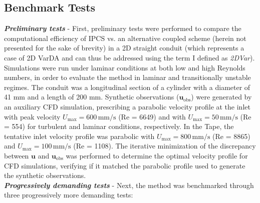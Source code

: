 \subsection*{Benchmark Tests}
\label{sec:bench}
\textbf{\textit{Preliminary tests}} - 
First, preliminary tests were performed to compare the computational efficiency of IPCS vs. an alternative coupled scheme (herein not presented for the sake of brevity) in a 2D straight conduit (which represents a case of 2D VarDA and can thus be addressed using the term I defined as \emph{2DVar}). Simulations were run under laminar conditions at both low and high Reynolds numbers, in order to evaluate the method in laminar and transitionally unstable regimes. 
The conduit was a longitudinal section of a cylinder with a diameter of 41 mm and a length of 200 mm. Synthetic observations (\( \mathbf{u}_{\text{obs}} \)) were generated by an auxiliary CFD simulation, prescribing a parabolic velocity profile at the inlet with peak velocity \( U_{\text{max}} = 600 \, \text{mm/s} \) (Re = 6649) and with \( U_{\text{max}} = 50 \, \text{mm/s} \) (Re = 554) for turbulent and laminar conditions, respectively.
In the Tape, the tentative inlet velocity profile was parabolic with \( U_{\text{max}} = 800 \, \text{mm/s} \) (Re = 8865) and \( U_{\text{max}} = 100 \, \text{mm/s} \) (Re = 1108).
The iterative minimization of the discrepancy between \( \mathbf{u} \) and \( \mathbf{u}_{\text{obs}} \) was performed to determine the optimal velocity profile for CFD simulations, verifying if it matched the parabolic profile used to generate the synthetic observations.\\

\textbf{\textit{Progressively demanding tests}} - Next, the method was benchmarked through three progressively more demanding tests:


